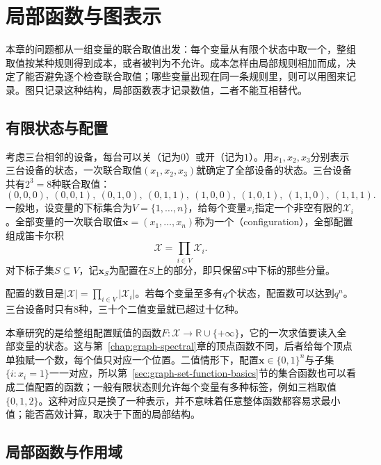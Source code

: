 
\section{局部函数与图表示}
\label{sec:graph-local-functions}

本章的问题都从一组变量的联合取值出发：每个变量从有限个状态中取一个，整组取值按某种规则得到成本，或者被判为不允许。成本怎样由局部规则相加而成，决定了能否避免逐个检查联合取值；哪些变量出现在同一条规则里，则可以用图来记录。图只记录这种结构，局部函数表才记录数值，二者不能互相替代。

\subsection{有限状态与配置}
\label{sec:graph-dp-configurations}

考虑三台相邻的设备，每台可以关（记为$0$）或开（记为$1$）。用$x_1,x_2,x_3$分别表示三台设备的状态，一次联合取值$(x_1,x_2,x_3)$就确定了全部设备的状态。三台设备共有$2^3=8$种联合取值：
\[
(0,0,0),\ (0,0,1),\ (0,1,0),\ (0,1,1),\ (1,0,0),\ (1,0,1),\ (1,1,0),\ (1,1,1).
\]
一般地，设变量的下标集合为$V=\{1,\ldots,n\}$，给每个变量$x_i$指定一个非空有限的$\mathcal X_i$。全部变量的一次联合取值$\bm x=(x_1,\ldots,x_n)$称为一个（configuration），全部配置组成笛卡尔积
\[
\mathcal X=\prod_{i\in V}\mathcal X_i .
\]
对下标子集$S\subseteq V$，记$\bm x_S$为配置在$S$上的部分，即只保留$S$中下标的那些分量。

配置的数目是$|\mathcal X|=\prod_{i\in V}|\mathcal X_i|$。若每个变量至多有$q$个状态，配置数可以达到$q^n$。三台设备时只有$8$种，三十个二值变量就已超过十亿种。

本章研究的是给整组配置赋值的函数$F:\mathcal X\to\mathbb R\cup\{+\infty\}$，它的一次求值要读入全部变量的状态。这与第~\ref{chap:graph-spectral}章的顶点函数不同，后者给每个顶点单独赋一个数，每个值只对应一个位置。二值情形下，配置$\bm x\in\{0,1\}^n$与子集$\{i:x_i=1\}$一一对应，所以第~\ref{sec:graph-set-function-basics}节的集合函数也可以看成二值配置的函数；一般有限状态则允许每个变量有多种标签，例如三档取值$\{0,1,2\}$。这种对应只是换了一种表示，并不意味着任意整体函数都容易求最小值；能否高效计算，取决于下面的局部结构。

\subsection{局部函数与作用域}
\label{sec:graph-dp-scopes}

